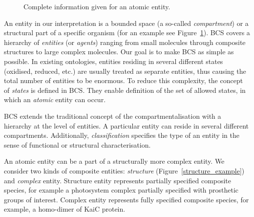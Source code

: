 \documentclass[12pt, twoside]{fithesis2} %
\begin{document}
\begin{figure}[!h]
\begin{center}
\end{center}
\caption{Complete information given for an atomic entity.}\label{entity_example}
\end{figure}

An entity in our interpretation is a bounded space (a so-called \emph{compartment}) or a structural part of a specific organism (for an example see Figure~\ref{entity_example}). BCS covers a hierarchy of \emph{entities} (or \emph{agents}) ranging from small molecules through composite structures to large complex molecules. Our goal is to make BCS as simple as possible. In existing ontologies, entities residing in several different states (oxidised, reduced, etc.) are usually treated as separate entities, thus causing the total number of entities to be enormous. To reduce this complexity, the concept of \emph{states} is defined in BCS. They enable definition of the set of allowed states, in which an \emph{atomic} entity can occur.

BCS extends the traditional concept of the compartmentalisation with a hierarchy at the level of entities. A particular entity can reside in several different compartments. Additionally, \emph{classification} specifies the type of an entity in the sense of functional or structural characterisation.

An atomic entity can be a part of a structurally more complex entity. We consider two kinds of composite entities: \emph{structure} (Figure~\ref{structure_example}) and \emph{complex} entity. Structure entity represents partially specified composite species, for example a photosystem complex partially specified with prosthetic groups of interest. Complex entity represents fully specified composite species, for example, a homo-dimer of KaiC protein.
\end{document}
